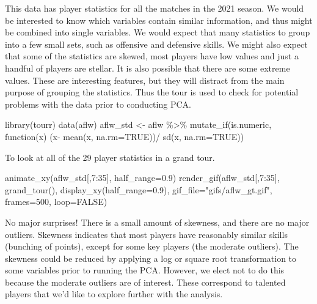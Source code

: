 \documentclass[
  letterpaper,
]{krantz}
\newenvironment{Shaded}{\begin{snugshade}}{\end{snugshade}}
\newcommand{\AttributeTok}[1]{\textcolor[rgb]{0.40,0.45,0.13}{#1}}
\newcommand{\ConstantTok}[1]{\textcolor[rgb]{0.56,0.35,0.01}{#1}}
\newcommand{\ControlFlowTok}[1]{\textcolor[rgb]{0.00,0.23,0.31}{#1}}
\newcommand{\DecValTok}[1]{\textcolor[rgb]{0.68,0.00,0.00}{#1}}
\newcommand{\FloatTok}[1]{\textcolor[rgb]{0.68,0.00,0.00}{#1}}
\newcommand{\FunctionTok}[1]{\textcolor[rgb]{0.28,0.35,0.67}{#1}}
\newcommand{\NormalTok}[1]{\textcolor[rgb]{0.00,0.23,0.31}{#1}}
\newcommand{\OtherTok}[1]{\textcolor[rgb]{0.00,0.23,0.31}{#1}}
\newcommand{\SpecialCharTok}[1]{\textcolor[rgb]{0.37,0.37,0.37}{#1}}
\newcommand{\StringTok}[1]{\textcolor[rgb]{0.13,0.47,0.30}{#1}}
\begin{document}
This data has player statistics for all the matches in the 2021 season.
We would be interested to know which variables contain similar
information, and thus might be combined into single variables. We would
expect that many statistics to group into a few small sets, such as
offensive and defensive skills. We might also expect that some of the
statistics are skewed, most players have low values and just a handful
of players are stellar. It is also possible that there are some extreme
values. These are interesting features, but they will distract from the
main purpose of grouping the statistics. Thus the tour is used to check
for potential problems with the data prior to conducting PCA.

\begin{Shaded}
\begin{Highlighting}[]
\FunctionTok{library}\NormalTok{(tourr)}
\FunctionTok{data}\NormalTok{(aflw)}
\NormalTok{aflw\_std }\OtherTok{\textless{}{-}}\NormalTok{ aflw }\SpecialCharTok{\%\textgreater{}\%}
  \FunctionTok{mutate\_if}\NormalTok{(is.numeric, }\ControlFlowTok{function}\NormalTok{(x) (x}\SpecialCharTok{{-}}
      \FunctionTok{mean}\NormalTok{(x, }\AttributeTok{na.rm=}\ConstantTok{TRUE}\NormalTok{))}\SpecialCharTok{/}
      \FunctionTok{sd}\NormalTok{(x, }\AttributeTok{na.rm=}\ConstantTok{TRUE}\NormalTok{))}
\end{Highlighting}
\end{Shaded}

To look at all of the 29 player statistics in a grand tour.

\begin{Shaded}
\begin{Highlighting}[]
\FunctionTok{animate\_xy}\NormalTok{(aflw\_std[,}\DecValTok{7}\SpecialCharTok{:}\DecValTok{35}\NormalTok{], }\AttributeTok{half\_range=}\FloatTok{0.9}\NormalTok{)}
\FunctionTok{render\_gif}\NormalTok{(aflw\_std[,}\DecValTok{7}\SpecialCharTok{:}\DecValTok{35}\NormalTok{], }
           \FunctionTok{grand\_tour}\NormalTok{(), }
           \FunctionTok{display\_xy}\NormalTok{(}\AttributeTok{half\_range=}\FloatTok{0.9}\NormalTok{),}
           \AttributeTok{gif\_file=}\StringTok{"gifs/aflw\_gt.gif"}\NormalTok{,}
           \AttributeTok{frames=}\DecValTok{500}\NormalTok{,}
           \AttributeTok{loop=}\ConstantTok{FALSE}\NormalTok{)}
\end{Highlighting}
\end{Shaded}

No major surprises! There is a small amount of skewness, and there are
no major outliers. Skewness indicates that most players have reasonably
similar skills (bunching of points), except for some key players (the
moderate outliers). The skewness could be reduced by applying a log or
square root transformation to some variables prior to running the PCA.
However, we elect not to do this because the moderate outliers are of
interest. These correspond to talented players that we'd like to explore
further with the analysis.
\end{document}
